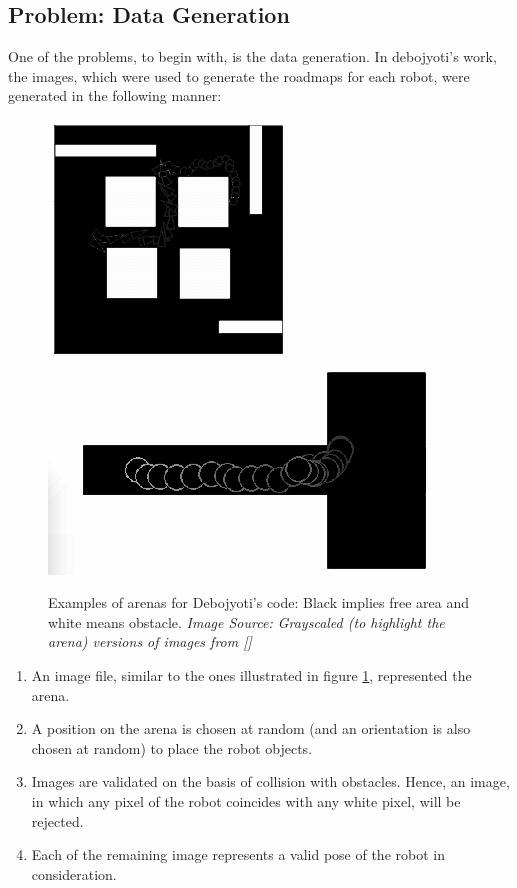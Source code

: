 \documentclass[12pt]{article}
\begin{document}
\subsection{Problem: Data Generation}
One of the problems, to begin with, is the data generation. In debojyoti's work, the images, which were used to generate the roadmaps for each robot, were generated in the following manner:
\begin{figure}
  \includegraphics[width=0.5\columnwidth]{exp1_deb}
  \includegraphics[width=0.5\columnwidth]{exp2_deb}
  \caption{Examples of arenas for Debojyoti's code: Black implies free area and white means obstacle. \textit{Image Source: Grayscaled (to highlight the arena) versions of images from [\cite{deb}]}}
  \label{twoD_arenas}
\end{figure}
\begin{enumerate}
  \item An image file, similar to the ones illustrated in figure \ref{twoD_arenas}, represented the arena.
  \item A position on the arena is chosen at random (and an orientation is also chosen at random) to place the robot objects.
  \item Images are validated on the basis of collision with obstacles. Hence, an image, in which any pixel of the robot coincides with any white pixel, will be rejected.
  \item Each of the remaining image represents a valid pose of the robot in consideration.
\end{enumerate}
\end{document}
